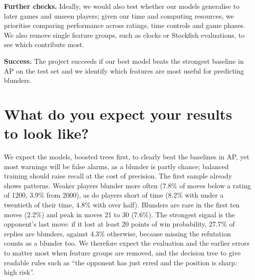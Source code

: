\documentclass[a4paper,oneside,bibliography=totoc]{scrbook}
\begin{document}
\textbf{Further checks.} Ideally, we would also test whether our models
generalise to later games and unseen players; given our time and computing
resources, we prioritise comparing performance across ratings, time controls
and game phases. We also remove single feature groups, such as clocks or
Stockfish evaluations, to see which contribute most.

\textbf{Success.} The project succeeds if our best model beats the strongest
baseline in AP on the test set and we identify which features are most
useful for predicting blunders.

\section{What do you expect your results to look like?}

We expect the models, boosted trees first, to clearly beat the baselines in
AP, yet most warnings will be false alarms, as a blunder is partly chance;
balanced training should raise recall at the cost of precision. The first
sample already shows patterns. Weaker players blunder more often (7.8\% of
moves below a rating of 1200, 3.9\% from 2000), as do players short of time
(8.2\% with under a twentieth of their time, 4.8\% with over half).
Blunders are rare in the first ten moves (2.2\%) and peak in moves 21 to 30
(7.6\%). The strongest signal is the opponent's last move: if it lost at
least 20 points of win probability, 27.7\% of replies are blunders, against
4.3\% otherwise, because missing the refutation counts as a blunder too. We
therefore expect the evaluation and the earlier errors to matter most when
feature groups are removed, and the decision tree to give readable rules
such as ``the opponent has just erred and the position is sharp: high
risk''.
\end{document}
